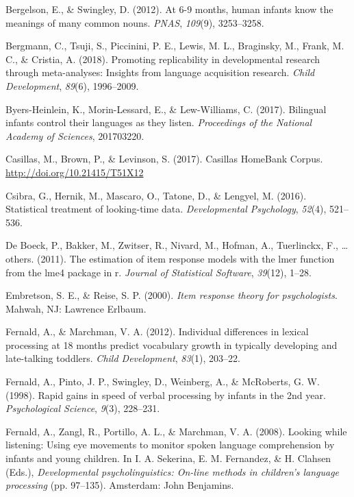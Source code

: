 \documentclass[10pt, letterpaper]{article}
\begin{document}
\leavevmode\hypertarget{ref-Bergelson2012a}{}%
Bergelson, E., \& Swingley, D. (2012). At 6-9 months, human infants know
the meanings of many common nouns. \emph{PNAS}, \emph{109}(9),
3253--3258.

\leavevmode\hypertarget{ref-Bergmann2018}{}%
Bergmann, C., Tsuji, S., Piccinini, P. E., Lewis, M. L., Braginsky, M.,
Frank, M. C., \& Cristia, A. (2018). Promoting replicability in
developmental research through meta-analyses: Insights from language
acquisition research. \emph{Child Development}, \emph{89}(6),
1996--2009.

\leavevmode\hypertarget{ref-Byers-Heinlein2017}{}%
Byers-Heinlein, K., Morin-Lessard, E., \& Lew-Williams, C. (2017).
Bilingual infants control their languages as they listen.
\emph{Proceedings of the National Academy of Sciences}, 201703220.

\leavevmode\hypertarget{ref-Casillas2017}{}%
Casillas, M., Brown, P., \& Levinson, S. (2017). Casillas HomeBank
Corpus. \url{http://doi.org/10.21415/T51X12}

\leavevmode\hypertarget{ref-Csibra2016}{}%
Csibra, G., Hernik, M., Mascaro, O., Tatone, D., \& Lengyel, M. (2016).
Statistical treatment of looking-time data. \emph{Developmental
Psychology}, \emph{52}(4), 521--536.

\leavevmode\hypertarget{ref-de-boeck2011}{}%
De Boeck, P., Bakker, M., Zwitser, R., Nivard, M., Hofman, A.,
Tuerlinckx, F., \ldots{} others. (2011). The estimation of item response
models with the lmer function from the lme4 package in r. \emph{Journal
of Statistical Software}, \emph{39}(12), 1--28.

\leavevmode\hypertarget{ref-embretson2000}{}%
Embretson, S. E., \& Reise, S. P. (2000). \emph{Item response theory for
psychologists}. Mahwah, NJ: Lawrence Erlbaum.

\leavevmode\hypertarget{ref-Fernald2012a}{}%
Fernald, A., \& Marchman, V. A. (2012). Individual differences in
lexical processing at 18 months predict vocabulary growth in typically
developing and late-talking toddlers. \emph{Child Development},
\emph{83}(1), 203--22.

\leavevmode\hypertarget{ref-fernald1998}{}%
Fernald, A., Pinto, J. P., Swingley, D., Weinberg, A., \& McRoberts, G.
W. (1998). Rapid gains in speed of verbal processing by infants in the
2nd year. \emph{Psychological Science}, \emph{9}(3), 228--231.

\leavevmode\hypertarget{ref-Fernald2008}{}%
Fernald, A., Zangl, R., Portillo, A. L., \& Marchman, V. A. (2008).
Looking while listening: Using eye movements to monitor spoken language
comprehension by infants and young children. In I. A. Sekerina, E. M.
Fernandez, \& H. Clahsen (Eds.), \emph{Developmental psycholinguistics:
On-line methods in children's language processing} (pp. 97--135).
Amsterdam: John Benjamins.
\end{document}
